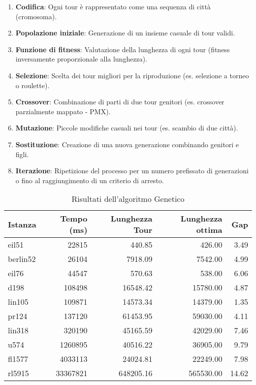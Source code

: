 \begin{enumerate}
	\item \textbf{Codifica}: Ogni tour è rappresentato come una sequenza di città (cromosoma).
	\item \textbf{Popolazione iniziale}: Generazione di un insieme casuale di tour validi.
	\item \textbf{Funzione di fitness}: Valutazione della lunghezza di ogni tour (fitness inversamente proporzionale alla lunghezza).
	\item \textbf{Selezione}: Scelta dei tour migliori per la riproduzione (es. selezione a torneo o roulette).
	\item \textbf{Crossover}: Combinazione di parti di due tour genitori (es. crossover parzialmente mappato - PMX).
	\item \textbf{Mutazione}: Piccole modifiche casuali nei tour (es. scambio di due città).
	\item \textbf{Sostituzione}: Creazione di una nuova generazione combinando genitori e figli.
	\item \textbf{Iterazione}: Ripetizione del processo per un numero prefissato di generazioni o fino al raggiungimento di un criterio di arresto.
\end{enumerate}
\begin{table}[H]
	\centering
	\caption{Risultati dell'algoritmo Genetico}
	\begin{tabular}{lrrrr}
		\toprule
		Istanza  & Tempo (ms) & Lunghezza Tour & Lunghezza ottima & Gap   \\
		\midrule
		eil51    & 22815      & 440.85         & 426.00           & 3.49  \\
		berlin52 & 26104      & 7918.09        & 7542.00          & 4.99  \\
		eil76    & 44547      & 570.63         & 538.00           & 6.06  \\
		d198     & 108498     & 16548.42       & 15780.00         & 4.87  \\
		lin105   & 109871     & 14573.34       & 14379.00         & 1.35  \\
		pr124    & 137120     & 61453.95       & 59030.00         & 4.11  \\
		lin318   & 320190     & 45165.59       & 42029.00         & 7.46  \\
		u574     & 1260895    & 40516.22       & 36905.00         & 9.79  \\
		fl1577   & 4033113    & 24024.81       & 22249.00         & 7.98  \\
		rl5915   & 33367821   & 648205.16      & 565530.00        & 14.62 \\
		\bottomrule
	\end{tabular}
\end{table}

